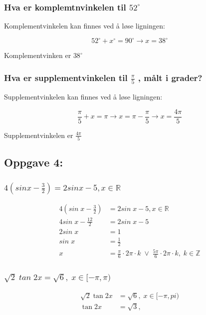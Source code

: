 \documentclass{article}
\begin{document}
\subsubsection{Hva er komplemtnvinkelen til $52^{\circ}$}

Komplementvinkelen kan finnes ved å løse ligningen:

$$52^{\circ}+x^{\circ}=90^{\circ} \rightarrow x=38^{\circ}$$

Komplementvinken er $38^{\circ}$

\subsubsection{Hva er supplementvinkelen til $\frac{\pi}{5}$ , målt i grader?}

Supplementvinkelen kan finnes ved å løse ligningen:

$$\frac{\pi}{5} + x = \pi \rightarrow x = \pi - \frac{\pi}{5} \rightarrow x = \frac{4\pi}{5}$$

Supplementvinkelen er $\frac{4\pi}{5}$

\subsection{Oppgave 4: }

\subsubsection{$4(sinx-\frac{3}{2}) = 2sinx-5, x \in \mathbb{R}$}

\begin{align*}
    4(sin\;x-\frac{3}{2}) &= 2sin\;x-5, x \in \mathbb{R} \\
    4sin\;x - \frac{12}{2} &= 2sin\;x-5 \\
    2sin\;x &= 1 \\
    sin \;x &= \frac{1}{2} \\
    x &= \frac{\pi}{6} \cdot 2\pi \cdot k \;\lor\; \frac{5 \pi}{6} \cdot 2 \pi \cdot k , \; k \in \mathbb{Z}
\end{align*}

\subsubsection{$\sqrt{2} \; tan \; 2x = \sqrt{6}, \; x \in [-\pi, \pi)$}

\begin{align*}
    \sqrt{2} \tan 2x &= \sqrt{6}, \; x \in [-\pi, pi) \\
    \tan 2x &= \sqrt3, \;
\end{align*}
\end{document}

